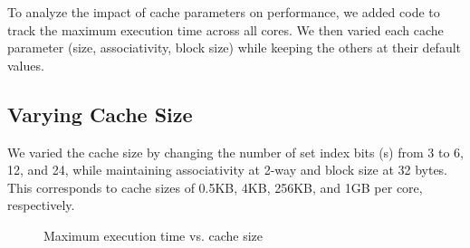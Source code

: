 \documentclass[11pt,a4paper]{article}
\begin{document}
    To analyze the impact of cache parameters on performance, we added code to track the maximum execution time across all cores. We then varied each cache parameter (size, associativity, block size) while keeping the others at their default values.

    \subsection{Varying Cache Size}

    We varied the cache size by changing the number of set index bits (s) from 3 to 6, 12, and 24, while maintaining associativity at 2-way and block size at 32 bytes. This corresponds to cache sizes of 0.5KB, 4KB, 256KB, and 1GB per core, respectively.

    \begin{figure}[H]
        \centering
        \caption{Maximum execution time vs. cache size}
        \label{fig:cache_size}
    \end{figure}
\end{document}

